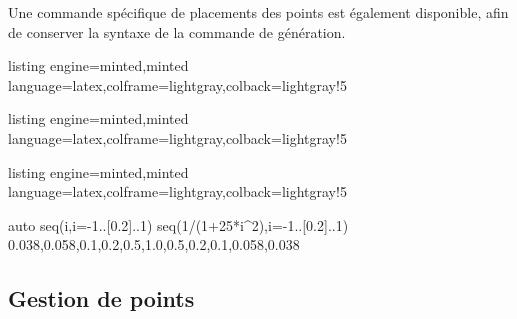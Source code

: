 \documentclass[11pt,a4paper]{ltxdoc}
\begin{document}
Une commande spécifique de placements des points est également disponible, afin de conserver la syntaxe de la commande de génération.

\begin{tcblisting}{listing engine=minted,minted language=latex,colframe=lightgray,colback=lightgray!5}
\begin{GraphiqueTikz}[Xmin=-5,Xmax=5,Ymin=-2,Ymax=5]
\end{GraphiqueTikz}
\end{tcblisting}

\begin{tcblisting}{listing engine=minted,minted language=latex,colframe=lightgray,colback=lightgray!5}
\begin{GraphiqueTikz}[Xmin=-5,Xmax=5,Ymin=-2,Ymax=5]
\end{GraphiqueTikz}
\end{tcblisting}

\begin{tcblisting}{listing engine=minted,minted language=latex,colframe=lightgray,colback=lightgray!5}
\begin{GraphiqueTikz}%
    [x=6cm,y=3cm,Xmin=-1.25,Xmax=1.25,Ymin=-0.5,Ymax=2,
    Xgrille=0.125,Xgrilles=1,Ygrille=0.25,Ygrilles=0.25]
    {auto}
  \GenererPolynomeLagrange%
    {seq(i,i=-1..[0.2]..1)}               %
    {seq(1/(1+25*i^2),i=-1..[0.2]..1)}    %
    {0.038,0.058,0.1,0.2,0.5,1.0,0.5,0.2,0.1,0.058,0.038}
\end{GraphiqueTikz}
\end{tcblisting}

\pagebreak

\subsection{Gestion de points}
\end{document}
